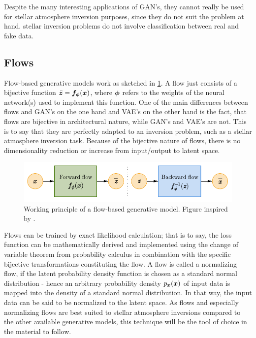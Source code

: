 \documentclass[a4paper,12pt]{report}
\def\lk#1{{\color{black}{#1}}}
\begin{document}
Despite the many interesting applications of GAN's, they cannot really be used for stellar atmosphere inversion purposes, since they do not suit the problem at hand. \lk{This is because} stellar inversion problems do not involve classification between real and fake data.

\subsection{Flows}
Flow-based generative models work as sketched in \cref{fig:Flow}. A flow just consists of a bijective function $\bar{\bm{z}} = \bm{f}_{\bm{\phi}}(\bm{x})$, where $\bm{\phi}$ refers to the weights of the neural network(s) used to implement this function. One of the main differences between flows and GAN's on the one hand and VAE's on the other hand is the fact, that flows are bijective in architectural nature, while GAN's and VAE's are not. This is to say that they are perfectly adapted to an inversion problem, such as a stellar atmosphere inversion task. Because of the bijective nature of flows, there is no dimensionality reduction or increase from input/output to latent space.
\begin{figure}[h!]
\centering
\includegraphics[width=\linewidth-4cm]{figures/Flow.pdf}
\caption{Working principle of a flow-based generative model. Figure inspired by \cite{weng2018flow}.}
\label{fig:Flow}
\end{figure}

Flows can be trained by exact likelihood calculation; that is to say, the loss function can be mathematically derived and implemented using the change of variable theorem from probability calculus in combination with the specific bijective transformations constituting the flow. A flow is called a normalizing flow, if the latent probability density function is chosen as a standard normal distribution - hence an arbitrary probability density $p_{\bm{x}}(\bm{x})$ of input data is mapped into the density of a standard normal distribution. In that way, the input data can be said to be normalized to the latent space. As flows and especially normalizing flows are best suited to stellar atmosphere inversions compared to the other available generative models, this technique will be the tool of choice in the material to follow.
\end{document}
